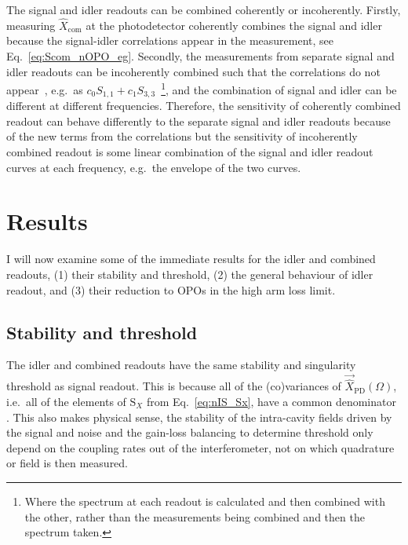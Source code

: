 The signal and idler readouts can be combined coherently or incoherently. Firstly, measuring $\hat{X}_\text{com}$ at the photodetector  coherently combines the signal and idler because the signal-idler correlations appear in the measurement, see Eq.~\ref{eq:Scom_nOPO_eg}. Secondly, the measurements from separate signal and idler readouts can be incoherently combined such that the correlations do not appear~\cite{}, e.g.\ as $c_0 S_{1,1}+ c_1 S_{3,3}$~\footnote{Where the spectrum at each readout is calculated and then combined with the other, rather than the measurements being combined and then the spectrum taken.}, and the combination of signal and idler can be different at different frequencies. Therefore, the sensitivity of coherently combined readout can behave differently to the separate signal and idler readouts because of the new terms from the correlations but the sensitivity of incoherently combined readout is some linear combination of the signal and idler readout curves at each frequency, e.g.\ the envelope of the two curves.


\section{Results}

I will now examine some of the immediate results for the idler and combined readouts, (1) their stability and threshold, (2) the general behaviour of idler readout, and (3) their reduction to OPOs in the high arm loss limit. %

\subsection{Stability and threshold}

The idler and combined readouts have the same stability and singularity threshold as signal readout. This is because all of the (co)variances of $\vec{\hat X}_\text{PD}(\Omega)$, i.e.\ all of the elements of $\text{S}_X$ from Eq.~\ref{eq:nIS_Sx}, have a common denominator . This also makes physical sense, the stability of the intra-cavity fields driven by the signal and noise  and the gain-loss balancing to determine threshold only depend on the coupling rates out of the interferometer, not on which quadrature or field is then measured.

